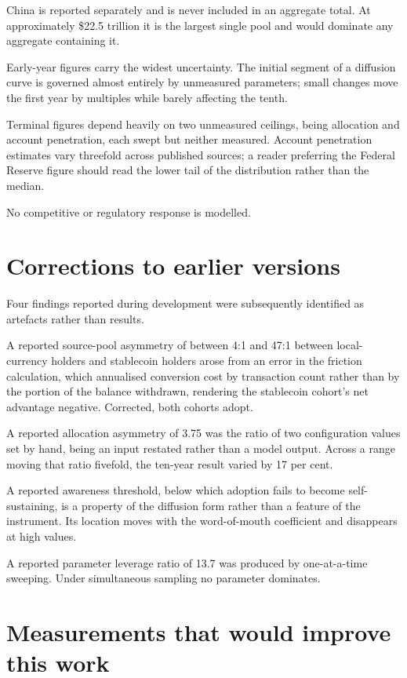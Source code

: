 \documentclass[11pt,a4paper]{article}
\begin{document}
China is reported separately and is never included in an aggregate total. At
approximately \$22.5 trillion it is the largest single pool and would
dominate any aggregate containing it.

Early-year figures carry the widest uncertainty. The initial segment of a
diffusion curve is governed almost entirely by unmeasured parameters; small
changes move the first year by multiples while barely affecting the tenth.

Terminal figures depend heavily on two unmeasured ceilings, being allocation
and account penetration, each swept but neither measured. Account
penetration estimates vary threefold across published sources; a reader
preferring the Federal Reserve figure should read the lower tail of the
distribution rather than the median.

No competitive or regulatory response is modelled.

\section{Corrections to earlier versions}

Four findings reported during development were subsequently identified as
artefacts rather than results.

A reported source-pool asymmetry of between 4:1 and 47:1 between
local-currency holders and stablecoin holders arose from an error in the
friction calculation, which annualised conversion cost by transaction count
rather than by the portion of the balance withdrawn, rendering the
stablecoin cohort's net advantage negative. Corrected, both cohorts adopt.

A reported allocation asymmetry of 3.75 was the ratio of two configuration
values set by hand, being an input restated rather than a model output.
Across a range moving that ratio fivefold, the ten-year result varied by 17
per cent.

A reported awareness threshold, below which adoption fails to become
self-sustaining, is a property of the diffusion form rather than a feature
of the instrument. Its location moves with the word-of-mouth coefficient and
disappears at high values.

A reported parameter leverage ratio of 13.7 was produced by one-at-a-time
sweeping. Under simultaneous sampling no parameter dominates.

\section{Measurements that would improve this work}
\end{document}
